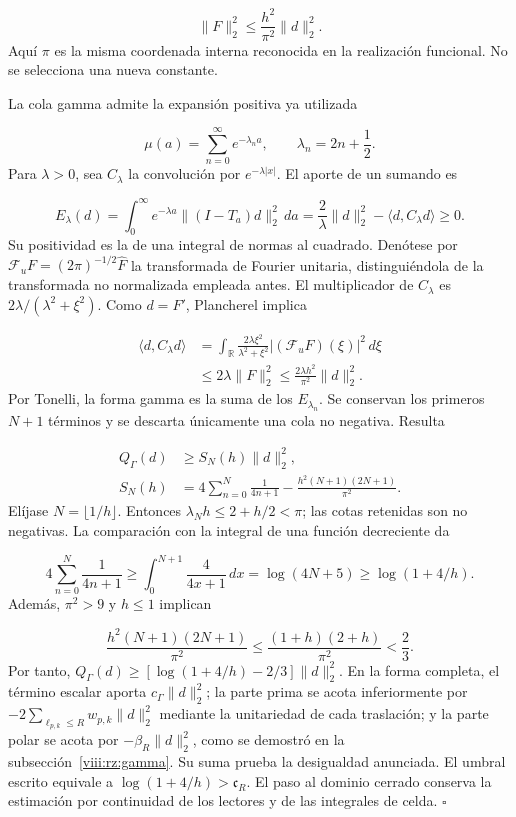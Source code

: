 \[
\|F\|_2^2\leq\frac{h^2}{\pi^2}\|d\|_2^2.
\]
Aquí \(\pi\) es la misma coordenada interna reconocida en la realización funcional. No se selecciona una nueva constante.

La cola gamma admite la expansión positiva ya utilizada

\[
\mu(a)=\sum_{n=0}^{\infty}e^{-\lambda_n a},
\qquad \lambda_n=2n+\frac12.
\]
Para \(\lambda>0\), sea \(C_\lambda\) la convolución por \(e^{-\lambda|x|}\). El aporte de un sumando es

\[
E_\lambda(d)=\int_0^\infty e^{-\lambda a}
\|(I-T_a)d\|_2^2\,da
=\frac2\lambda\|d\|_2^2-
\langle d,C_\lambda d\rangle\geq0.
\]
Su positividad es la de una integral de normas al cuadrado. Denótese por \(\mathcal F_u F=(2\pi)^{-1/2}\widehat F\) la transformada de Fourier unitaria, distinguiéndola de la transformada no normalizada empleada antes. El multiplicador de \(C_\lambda\) es \(2\lambda/(\lambda^2+\xi^2)\). Como \(d=F'\), Plancherel implica

\[
\begin{aligned}
\langle d,C_\lambda d\rangle
&=\int_{\mathbb R}
\frac{2\lambda\xi^2}{\lambda^2+\xi^2}
|(\mathcal F_u F)(\xi)|^2\,d\xi\\
&\leq2\lambda\|F\|_2^2
\leq\frac{2\lambda h^2}{\pi^2}\|d\|_2^2.
\end{aligned}
\]
Por Tonelli, la forma gamma es la suma de los \(E_{\lambda_n}\). Se conservan los primeros \(N+1\) términos y se descarta únicamente una cola no negativa. Resulta

\[
\begin{aligned}
Q_\Gamma(d)&\geq S_N(h)\|d\|_2^2,\\
S_N(h)&=4\sum_{n=0}^N\frac1{4n+1}
-\frac{h^2(N+1)(2N+1)}{\pi^2}.
\end{aligned}
\]
Elíjase \(N=\lfloor1/h\rfloor\). Entonces \(\lambda_N h\leq2+h/2<\pi\); las cotas retenidas son no negativas. La comparación con la integral de una función decreciente da

\[
4\sum_{n=0}^N\frac1{4n+1}
\geq\int_0^{N+1}\frac4{4x+1}\,dx
=\log(4N+5)\geq\log(1+4/h).
\]
Además, \(\pi^2>9\) y \(h\leq1\) implican

\[
\frac{h^2(N+1)(2N+1)}{\pi^2}
\leq\frac{(1+h)(2+h)}{\pi^2}<\frac23.
\]
Por tanto, \(Q_\Gamma(d)\geq[\log(1+4/h)-2/3]\|d\|_2^2\). En la forma completa, el término escalar aporta \(c_\Gamma\|d\|_2^2\); la parte prima se acota inferiormente por \(-2\sum_{\ell_{p,k}\leq R}w_{p,k}\|d\|_2^2\) mediante la unitariedad de cada traslación; y la parte polar se acota por \(-\beta_R\|d\|_2^2\), como se demostró en la subsección~\ref{viii:rz:gamma}. Su suma prueba la desigualdad anunciada. El umbral escrito equivale a \(\log(1+4/h)>\mathfrak c_R\). El paso al dominio cerrado conserva la estimación por continuidad de los lectores y de las integrales de celda. \hfill\(\square\)

